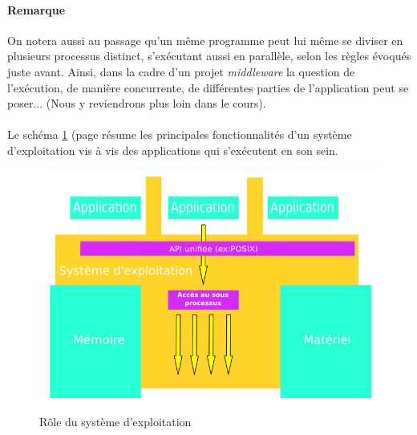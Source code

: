 {    \paragraph{Remarque} On notera aussi au passage qu'un même programme peut lui même se diviser en
    plusieurs processus distinct, s'exécutant aussi en parallèle, selon les règles évoqués juste
    avant. Ainsi, dans la cadre d'un projet \textit{middleware} la question de l'exécution, de
    manière concurrente, de différentes parties de l'application peut se poser... (Nous y
    reviendrons plus loin dans le cours).

    \paragraph{} Le schéma \ref{role-os} (page \pageref{role-os} résume les principales
    fonctionnalités d'un système d'exploitation vis à vis des applications qui s'exécutent en son
    sein.

    \begin{figure}[h]
      \begin{center}
        \includegraphics[scale=0.3]{img/operating-system.png}
        \caption{Rôle du système d'exploitation}
        \label{role-os}
      \end{center}
    \end{figure}
}

